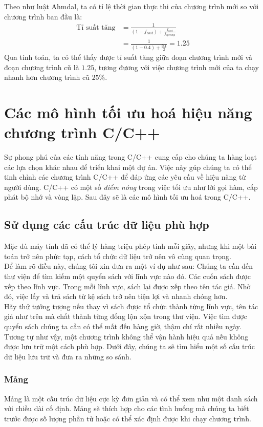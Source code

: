 \documentclass{article}
\begin{document}
Theo như luật Ahmdal, ta có tỉ lệ thời gian thực thi của chương trình mới so với chương trình ban đầu là:
\begin{align*}
     \text{Tỉ suất tăng} &= \frac{1}{\left(1 - f_{cost}\right) + \frac{f_{cost}}{{f_{speedup}}}} \\
    &= \frac{1}{\left(1-0.4\right) + \frac{0.4}{2}} = 1.25
\end{align*}
Qua tính toán, ta có thể thấy được tỉ suất tăng giữa đoạn chương trình mới và đoạn chương trình cũ là $1.25$, tương đương với việc chương trình mới của ta chạy nhanh hơn chương trình cũ $25\%$. 
\section{Các mô hình tối ưu hoá hiệu năng chương trình C/C++}
Sự phong phú của các tính năng trong C/C++ cung cấp cho chúng ta hàng loạt các lựa chọn khác nhau để triển khai một dự án. Việc này gúp chúng ta có thể tinh chỉnh các chương trình C/C++ để đáp ứng các yêu cầu về hiệu năng từ người dùng. C/C++ có một số \textit{điểm nóng} trong việc tối ưu như lời gọi hàm, cấp phát bộ nhớ và vòng lặp. Sau đây sẽ là các mô hình tối ưu hoá trong C/C++.

\subsection{Sử dụng các cấu trúc dữ liệu phù hợp}
Mặc dù máy tính đã có thể lý hàng triệu phép tính mỗi giây, nhưng khi một bài toán trở nên phức tạp, cách tổ chức dữ liệu trở nên vô cùng quan trọng.\\

Để làm rõ điều này, chúng tôi xin đưa ra một ví dụ như sau: Chúng ta cần đến thư viện để tìm kiếm một quyển sách với lĩnh vực nào đó. Các cuốn sách được xếp theo lĩnh vực. Trong mỗi lĩnh vực, sách lại được xếp theo tên tác giả. Nhờ đó, việc lấy và trả sách từ kệ sách trở nên tiện lợi và nhanh chóng hơn.\\

Hãy thử tưởng tượng nếu thay vì sách được tổ chức thành từng lĩnh vực, tên tác giả như trên mà chất thành từng đống lộn xộn trong thư viện. Việc tìm được quyển sách chúng ta cần có thể mất đến hàng giờ, thậm chí rất nhiều ngày. Tương tự như vậy, một chương trình không thể vận hành hiệu quả nếu không được lưu trữ một cách phù hợp. Dưới đây, chúng ta sẽ tìm hiểu một số cấu trúc dữ liệu lưu trữ và đưa ra những so sánh.

\subsubsection{Mảng}
Mảng \cite{introductiontoalgorithm} là một cấu trúc dữ liệu cực kỳ đơn giản và có thể xem như một danh sách với chiều dài cố định. Mảng sẽ thích hợp cho các tình huống mà chúng ta biết trước được số lượng phần tử hoặc có thể xác định được khi chạy chương trình.\\
\end{document}
